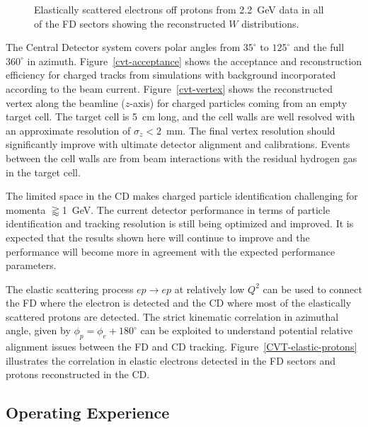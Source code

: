 \documentclass[final,3p,twocolumn]{elsarticle}
\begin{document}
\begin{figure}[t!]
\caption{Elastically scattered electrons off protons from 2.2~GeV data in all of the FD sectors showing the
  reconstructed $W$ distributions.}
\label{elastic-electrons}
\end{figure}

The Central Detector system covers polar angles from $35^\circ$ to $125^\circ$ and the full $360^\circ$ in azimuth.
Figure~\ref{cvt-acceptance} shows the acceptance and reconstruction efficiency for charged tracks from
simulations with background incorporated according to the beam current. Figure~\ref{cvt-vertex}  shows the
reconstructed vertex along the beamline ($z$-axis) for charged particles coming from an empty target cell. The
target cell is 5~cm long, and the cell walls are well resolved with an approximate resolution of $\sigma_z<2$~mm.
The final vertex resolution should significantly improve with ultimate detector alignment and calibrations. Events
between the cell walls are from beam interactions with the residual hydrogen gas in the target cell.  

The limited space in the CD makes charged particle identification challenging for momenta $\gtrapprox$1~GeV.
The current detector performance in terms of particle identification and tracking resolution is still being optimized
and improved. It is expected that the results shown here will continue to improve and the performance will become
more in agreement with the expected performance parameters.

The elastic scattering process $ep \to ep$ at relatively low $Q^2$ can be used to connect the FD where the electron
is detected and the CD where most of the elastically scattered protons are detected. The strict kinematic correlation
in azimuthal angle, given by  $\phi_p = \phi_e + 180^\circ$  can be exploited to understand potential relative alignment
issues between the FD and CD tracking. Figure~\ref{CVT-elastic-protons} illustrates the correlation in elastic
electrons detected in the FD sectors and protons reconstructed in the CD. 



\subsection{Operating Experience}
\end{document}
